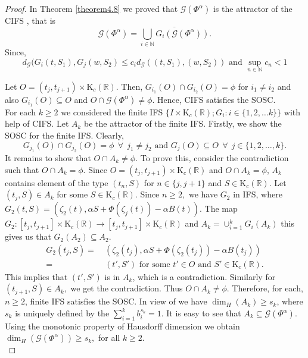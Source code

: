 \documentclass[12pt,oneside,reqno]{amsart}
\theoremstyle{definition}
\theoremstyle{remark}
\begin{document}
\begin{proof}
    In Theorem \ref{theorem4.8} we proved that $\mathcal{G}(\Phi^\alpha )$ is the attractor of the CIFS , that is 
    \[ \mathcal{G}(\Phi^\alpha ) = \overline{ \underset{i\in \mathbb{N}}{\bigcup}G_i(\mathcal{G}(\Phi^\alpha))}. \]
Since, 
\[ d_{\mathcal{G}}( G_i(t,S_1),G_j(w,S_2)\le c_i d_\mathcal{G}((t,S_1),(w,S_2)) \text{ and } \sup_{n\in \mathbb{N}}c_n <1 \]

Let $O=(t_j,t_{j+1})\times \mathrm{K}_c(\mathbb{R})$. Then, $G_{i_1}(O)\cap G_{i_2}(O) = \phi$ for $i_1 \neq i_2$ and also $G_{i_1}(O)\subseteq O$ and $O \cap \mathcal{G}(\Phi^\alpha)\neq \phi .$ Hence, CIFS satisfies the SOSC. \\
For each $k\geq 2$ we considered the finite IFS $\{I\times \mathrm{K}_c(\mathbb{R});G_i:i\in \{1,2,\dots k\}\}$ with help of CIFS. Let $A_k$ be the attractor of the finite IFS. Firstly, we show the SOSC for the finite IFS. Clearly, \[ G_{j_1}(O)\cap G_{j_2}(O)= \phi~~ \forall ~~
 j_1\neq j_2 \text{ and } G_j(O) \subseteq O ~~ \forall ~~ j \in \{1,2, \dots,k\}.\]
 It remains to show that $O\cap A_k \neq \phi $. To prove this, consider the contradiction such that $O\cap A_k = \phi$. Since $O=(t_j,t_{j+1})\times \mathrm{K}_c(\mathbb{R})$ and $O\cap A_k = \phi $, $A_k$ contains element of the type $(t_n,S)$ for $n \in \{j,j+1\} $ and $S\in \mathrm{K}_c(\mathbb{R}) $. Let $(t_j,S) \in A_k$ for some $S \in \mathrm{K}_c(\mathbb{R})$. Since $n \geq 2,$ we have $G_2$ in IFS, where $G_2(t,S)=(\zeta_2(t),\alpha S+\Phi(\zeta_j(t))-\alpha B(t))$. The map $G_2:[t_j,t_{j+1}]\times \mathrm{K}_c(\mathbb{R}) \rightarrow [t_j,t_{j+1}]\times \mathrm{K}_c(\mathbb{R})$ and $A_k=\cup_{i=1}^{k}G_i(A_k)$ this gives us that $G_2(A_2)\subseteq A_2$. 
 \begin{equation*}
     \begin{aligned}
         G_2(t_j,S)=&~ (\zeta_2(t_j),\alpha S+\Phi(\zeta_2(t_j))-\alpha B(t_j)) \\ =&~(t',S') \text{ for some } t'\in O \text{ and } S' \in \mathrm{K}_c(\mathbb{R}).
     \end{aligned}
 \end{equation*}
 This implies that $(t',S')$ is in $A_k$, which is a contradiction. Similarly for $(t_{j+1},S)\in A_k,$ we get the contradiction. Thus $O\cap A_k \neq \phi $. Therefore, for each, $n\geq 2$, finite IFS satisfies the SOSC. In view of \cite{Mverma4} we have  $\dim_H(A_k)\ge s_k$, where $s_k$ is uniquely defined by the $\sum_{i=1}^{k}b_i^{s_k} =1$. It is easy to see that $A_k \subseteq \mathcal{G}(\Phi^\alpha)$. Using the monotonic property of Hausdorff dimension we obtain $ \dim_H(\mathcal{G}(\Phi^\alpha)) \geq s_k,$ for all $k \geq 2$.\\

\end{proof}
\end{document}
